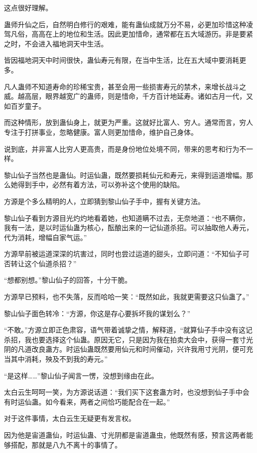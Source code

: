\begin{this_body}
这点很好理解。

蛊师升仙之后，自然明白修行的艰难，能有蛊仙成就万分不易，必更加珍惜这种凌驾凡俗，高高在上的地位和生活。因此更加惜命，通常都在五大域游历。非是要紧之时，不会进入福地洞天中生活。

皆因福地洞天中时间很快，蛊仙寿元有限，在当中生活，比在五大域中要消耗更多。

凡人蛊师不知道寿命的珍稀宝贵，甚至会用一些损害寿元的禁术，来增长战斗之威。越高层，眼界越宽广的蛊师，则是惜命，千方百计地延寿。诸如古月一代，又如百岁童子。

而这种情形，放到蛊仙身上，就更为严重。这就好比富人、穷人。通常而言，穷人专注于打拼事业，忽略健康。富人则更加惜命，维护自己身体。

说到底，并非富人比穷人更高贵，而是身份地位处境不同，带来的思考和行为不一样。

黎山仙子当然也是蛊仙。时运仙蛊，既然要损耗仙元和寿元，来得到运道增幅。那么她得到手中，必然有着方法，可以弥补这个使用的缺陷。

方源是个多么精明的人，立即猜到黎山仙子手中，握有关键方法。

黎山仙子看到方源目光灼灼地看着她，也知道瞒不过去，无奈地道：“也不瞒你，我有一法，是以时运仙蛊为核心，酝酿出来的一记仙道杀招。可以抽取他人寿元，代为消耗，增幅自家气运。”

方源早前被运道深深的坑害过，同时也尝过运道的甜头，立即问道：“不知仙子可否转让这个仙道杀招？”

“想都别想。”黎山仙子的回答，十分干脆。

方源早已预料，也不失落，反而哈哈一笑：“既然如此，我就更需要这只仙蛊了。”

黎山仙子面色转冷：“方源，你这是存心要拆坏我的谋划么？”

“不敢。”方源立即正色肃容，语气带着诚挚之情，解释道，“就算仙子手中没有这记杀招，我也要选择这个仙蛊。原因无它，只是因为我在拍卖大会中，获得一套寸光阴的凡道改良蛊方。时运仙蛊既然要用仙元和时间催动，兴许我用寸光阴，便可充当其中消耗，殃及不到我的寿元。”

“是这样……”黎山仙子闻言一愣，没想到缘由在此。

太白云生呵呵一笑，为方源说话道：“我们买下这套蛊方时，也没想到仙子手中会有时运仙蛊。如今看来，两者之间恰巧能配合在一起。”

对于这件事情，太白云生无疑更有发言权。

因为他是宙道蛊仙，时运仙蛊、寸光阴都是宙道蛊虫，他既然有感，预言这两者能够搭配，那就是八九不离十的事情了。


\end{this_body}
